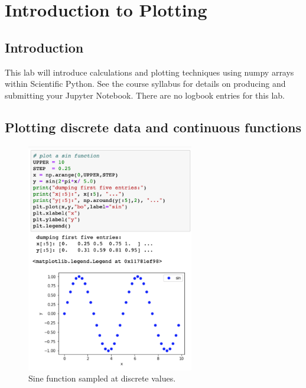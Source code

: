 \chapter{Introduction to Plotting}

\section{Introduction}

This lab will introduce calculations and plotting techniques using
numpy arrays within Scientific Python. See the course syllabus for
details on producing and submitting your Jupyter Notebook. There are no
logbook entries for this lab.

\section{Plotting discrete data and continuous functions}

\begin{figure}[htbp]
\begin{center}
\includegraphics[width=0.65\textwidth]{figs/labs//plotting/plotting.png} 
\caption{Sine function sampled at discrete values.}
\label{fig:plotsin}
\end{center}
\end{figure}

